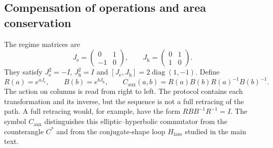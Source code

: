 \subsection{Compensation of operations and area conservation}
\label{md:aux:conmutador}

The regime matrices are
\begin{equation}
 J_{\mathrm e}=\begin{pmatrix}0&1\\-1&0\end{pmatrix},\qquad
 J_{\mathrm h}=\begin{pmatrix}0&1\\1&0\end{pmatrix}.
 \label{md:aux:regimenes}
\end{equation}
They satisfy $J_{\mathrm e}^2=-I$, $J_{\mathrm h}^2=I$ and
$[J_{\mathrm e},J_{\mathrm h}]=2\operatorname{diag}(1,-1)$.
Define
\begin{equation}
 R(a)=e^{aJ_{\mathrm e}},\qquad B(b)=e^{bJ_{\mathrm h}},\qquad
 C_{\mathrm{aux}}(a,b)=R(a)B(b)R(a)^{-1}B(b)^{-1}.
 \label{md:aux:def-compensado}
\end{equation}
The action on columns is read from right to left. The protocol contains
each transformation and its inverse, but the sequence is not a full
retracing of the path. A full retracing would, for example, have the
form $RBB^{-1}R^{-1}=I$. The symbol $C_{\mathrm{aux}}$ distinguishes
this elliptic--hyperbolic commutator from the counterangle $C^*$ and
from the conjugate-shape loop $H_{\mathrm{lazo}}$ studied in the main
text.

